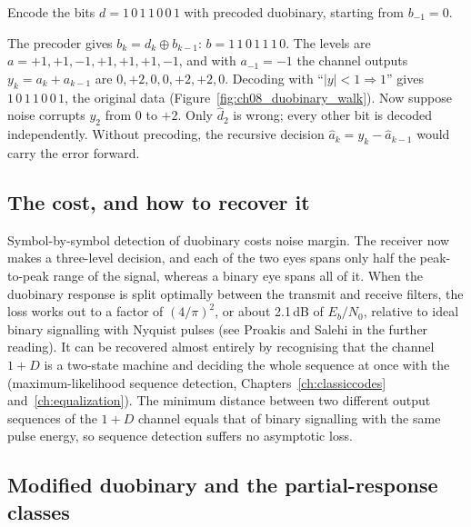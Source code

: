 \begin{worked}
Encode the bits $d=1\,0\,1\,1\,0\,0\,1$ with precoded duobinary, starting from $b_{-1}=0$.

The precoder gives $b_k=d_k\oplus b_{k-1}$: $b=1\,1\,0\,1\,1\,1\,0$. The levels are
$a=+1,+1,-1,+1,+1,+1,-1$, and with $a_{-1}=-1$ the channel outputs $y_k=a_k+a_{k-1}$ are
$0,+2,0,0,+2,+2,0$. Decoding with ``$|y|<1\Rightarrow1$'' gives $1\,0\,1\,1\,0\,0\,1$, the
original data (Figure~\ref{fig:ch08_duobinary_walk}). Now suppose noise corrupts $y_2$ from 0
to $+2$. Only $\hat d_2$ is wrong; every other bit is decoded independently. Without
precoding, the recursive decision $\hat a_k=y_k-\hat a_{k-1}$ would carry the error forward.
\end{worked}


\subsection{The cost, and how to recover it}

Symbol-by-symbol detection of duobinary costs noise margin. The receiver now makes a
three-level decision, and each of the two eyes spans only half the peak-to-peak range of the
signal, whereas a binary eye spans all of it. When the duobinary response is split optimally
between the transmit and receive filters, the loss works out to a factor of $(4/\pi)^2$, or
about 2.1\,dB of $E_b/N_0$, relative to ideal binary signalling with Nyquist pulses (see
Proakis and Salehi in the further reading). It can be recovered almost entirely by recognising
that the channel $1+D$ is a two-state machine and deciding the whole sequence at once with the
 (maximum-likelihood sequence detection, Chapters~\ref{ch:classiccodes}
and~\ref{ch:equalization}). The minimum distance between two different output sequences of the
$1+D$ channel equals that of binary signalling with the same pulse energy, so sequence detection
suffers no asymptotic loss.

\subsection{Modified duobinary and the partial-response classes}

